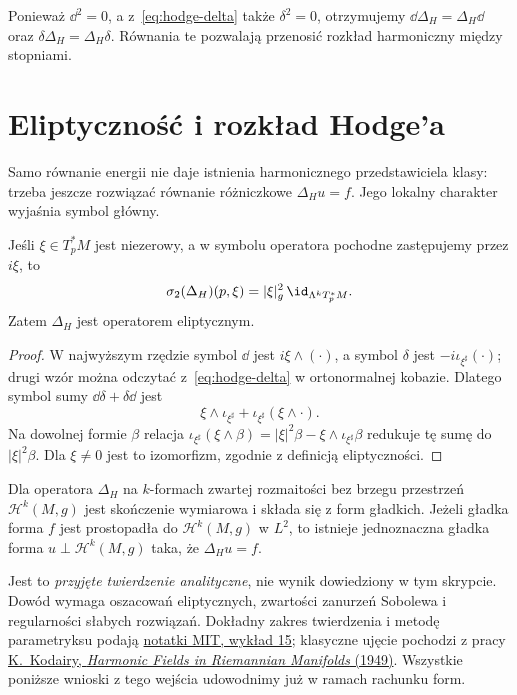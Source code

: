 Ponieważ $\dd^2=0$, a z~\eqref{eq:hodge-delta} także
$\delta^2=0$, otrzymujemy $\dd\Delta_H=\Delta_H\dd$
oraz $\delta\Delta_H=\Delta_H\delta$. Równania te
pozwalają przenosić rozkład harmoniczny między stopniami.

\section{Eliptyczność i rozkład Hodge'a}
\label{sec:hodge-rozklad}

Samo równanie energii nie daje istnienia harmonicznego
przedstawiciela klasy: trzeba jeszcze rozwiązać równanie
różniczkowe $\Delta_Hu=f$. Jego lokalny charakter wyjaśnia
symbol główny.

\begin{stwierdzenie}
\label{prop:hodge-symbol}
Jeśli $\xi\in T_p^*M$ jest niezerowy, a w symbolu operatora
pochodne zastępujemy przez $i\xi$, to
\begin{equation}\label{eq:hodge-symbol}
 \sigma_2(\Delta_H)(p,\xi)
 =|\xi|_g^2\,\id_{\Lambda^kT_p^*M}.
\end{equation}
Zatem $\Delta_H$ jest operatorem eliptycznym.
\end{stwierdzenie}
\begin{proof}
W najwyższym rzędzie symbol $\dd$ jest
$i\xi\wedge(\cdot)$, a symbol $\delta$ jest
$-i\iota_{\xi^\sharp}(\cdot)$; drugi wzór można
odczytać z~\eqref{eq:hodge-delta} w ortonormalnej kobazie.
Dlatego symbol sumy $\dd\delta+\delta\dd$ jest
\[
 \xi\wedge\iota_{\xi^\sharp}
 +\iota_{\xi^\sharp}(\xi\wedge\cdot).
\]
Na dowolnej formie $\beta$ relacja
$\iota_{\xi^\sharp}(\xi\wedge\beta)
=|\xi|^2\beta-\xi\wedge\iota_{\xi^\sharp}\beta$
redukuje tę sumę do $|\xi|^2\beta$. Dla $\xi\ne0$
jest to izomorfizm, zgodnie z definicją eliptyczności.
\end{proof}

\begin{twierdzenie}
\label{thm:hodge-analytic-input}
Dla operatora $\Delta_H$ na $k$-formach zwartej
rozmaitości bez brzegu przestrzeń $\mathcal H^k(M,g)$
jest skończenie wymiarowa i składa się z form gładkich.
Jeżeli gładka forma $f$ jest prostopadła do
$\mathcal H^k(M,g)$ w $L^2$, to istnieje jednoznaczna
gładka forma $u\perp\mathcal H^k(M,g)$ taka, że
$\Delta_Hu=f$.
\end{twierdzenie}

Jest to \emph{przyjęte twierdzenie analityczne},
nie wynik dowiedziony w tym skrypcie. Dowód wymaga
oszacowań eliptycznych, zwartości zanurzeń Sobolewa i
regularności słabych rozwiązań. Dokładny zakres
twierdzenia i metodę parametryksu podają
\href{https://ocw.mit.edu/courses/18-966-geometry-of-manifolds-spring-2007/d6848bb391c032ef27993e984fef4558_lect15.pdf}
{notatki MIT, wykład 15}; klasyczne ujęcie pochodzi z pracy
\href{https://doi.org/10.2307/1969552}
{K.\ Kodairy, \emph{Harmonic Fields in Riemannian Manifolds}
(1949)}. Wszystkie poniższe wnioski z tego wejścia
udowodnimy już w ramach rachunku form.

